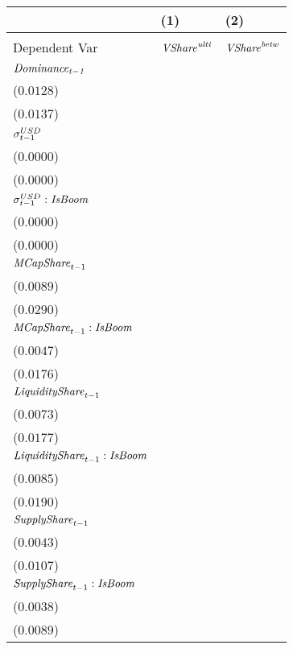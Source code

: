 \begin{tabular}{lll}
\toprule
{} &                                       (1) &                                       (2) \\
\midrule
Dependent Var                             &               $${\it VShare}^{\it ulti}$$ &               $${\it VShare}^{\it betw}$$ \\
$\it Dominance_{t-1}$                     &   \makecell{$0.8681^{***}$ \\ ($0.0128$)} &   \makecell{$0.8704^{***}$ \\ ($0.0137$)} \\
${\it \sigma}^{USD}_{t-1}$                &    \makecell{$-0.0000^{*}$ \\ ($0.0000$)} &   \makecell{$0.0000^{***}$ \\ ($0.0000$)} \\
${\it \sigma}^{USD}_{t-1}:{\it IsBoom}$   &   \makecell{$0.0000^{***}$ \\ ($0.0000$)} &  \makecell{$-0.0000^{***}$ \\ ($0.0000$)} \\
${\it MCapShare}_{t-1}$                   &      \makecell{$0.0113^{}$ \\ ($0.0089$)} &     \makecell{$-0.0031^{}$ \\ ($0.0290$)} \\
${\it MCapShare}_{t-1}:{\it IsBoom}$      &     \makecell{$-0.0003^{}$ \\ ($0.0047$)} &   \makecell{$0.0828^{***}$ \\ ($0.0176$)} \\
${\it LiquidityShare}_{t-1}$              &   \makecell{$0.0480^{***}$ \\ ($0.0073$)} &   \makecell{$0.1099^{***}$ \\ ($0.0177$)} \\
${\it LiquidityShare}_{t-1}:{\it IsBoom}$ &     \makecell{$-0.0012^{}$ \\ ($0.0085$)} &     \makecell{$-0.0020^{}$ \\ ($0.0190$)} \\
${\it SupplyShare}_{t-1}$                 &   \makecell{$0.0195^{***}$ \\ ($0.0043$)} &   \makecell{$0.0428^{***}$ \\ ($0.0107$)} \\
${\it SupplyShare}_{t-1}:{\it IsBoom}$    &    \makecell{$-0.0069^{*}$ \\ ($0.0038$)} &   \makecell{$-0.0198^{**}$ \\ ($0.0089$)} \\

\end{tabular}
